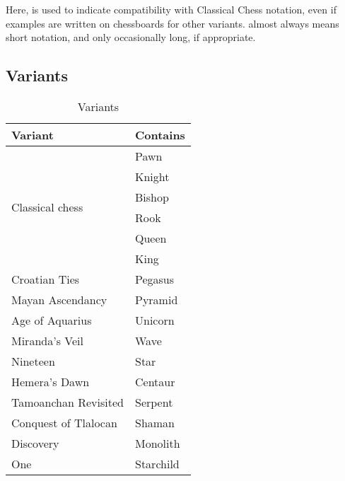 Here,  is used to indicate compatibility with Classical Chess notation, even if
examples are written on chessboards for other variants.  almost always means
short notation, and only occasionally long, if appropriate.

\clearpage %

\subsection*{Variants}
\label{sec:Appendix/Introduction/Variants}

\begin{table}[!h]
\centering
\begin{tabular}{ ll }
\toprule %
\textbf{Variant} & \textbf{Contains}           \\
\midrule %
\multirow{6}{*}{Classical chess} & Pawn        \\
                                 & Knight      \\
                                 & Bishop      \\
                                 & Rook        \\
                                 & Queen       \\
                                 & King        \\
\cmidrule{1-2} %
Croatian Ties                    & Pegasus     \\
Mayan Ascendancy                 & Pyramid     \\
Age of Aquarius                  & Unicorn     \\
Miranda's Veil                   & Wave        \\
Nineteen                         & Star        \\
Hemera's Dawn                    & Centaur     \\
Tamoanchan Revisited             & Serpent     \\
Conquest of Tlalocan             & Shaman      \\
Discovery                        & Monolith    \\
One                              & Starchild   \\
\bottomrule %
\end{tabular}
\caption{Variants}
\label{tbl:Appendix/Introduction/Variants}
\end{table}

